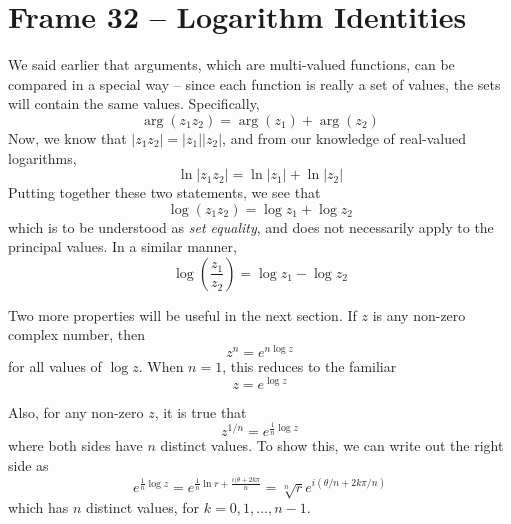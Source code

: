 \documentclass{article}
\begin{document}
\clearpage
\section{Frame 32 -- Logarithm Identities}
We said earlier that arguments, which are multi-valued functions, can be compared in a special way -- since each function is really a set of values, the sets will contain the same values. Specifically,
\[
	\arg(z_1 z_2) = \arg(z_1) + \arg(z_2)
\]
Now, we know that $|z_1z_2| = |z_1||z_2|$, and from our knowledge of real-valued logarithms,
\[
	\ln|z_1 z_2| = \ln|z_1| + \ln|z_2|
\]
Putting together these two statements, we see that
\[
	\log(z_1 z_2) = \log z_1 + \log z_2
\]
which is to be understood as \textit{set equality}, and does not necessarily apply to the principal values. In a similar manner,
\[
	\log \left( \frac{z_1}{z_2} \right) = \log z_1 - \log z_2
\]

Two more properties will be useful in the next section. If $z$ is any non-zero complex number, then
\[
	z^n = e^{n \log z}
\]
for all values of $\log z$. When $n = 1$, this reduces to the familiar
\[
	z = e^{\log z}
\]

Also, for any non-zero $z$, it is true that
\[
	z^{1 / n} = e^{\frac{1}{n} \log z}
\]
where both sides have $n$ distinct values. To show this, we can write out the right side as
\[
	e^{\frac{1}{n} \log z}
	= e^{\frac{1}{n} \ln r + \frac{i (\theta + 2k\pi}{n}}
	= \sqrt[n]{r} e^{i(\theta/n + 2k\pi/n)}
\]
which has $n$ distinct values, for $k = 0, 1, \dots, n - 1$.
\end{document}
